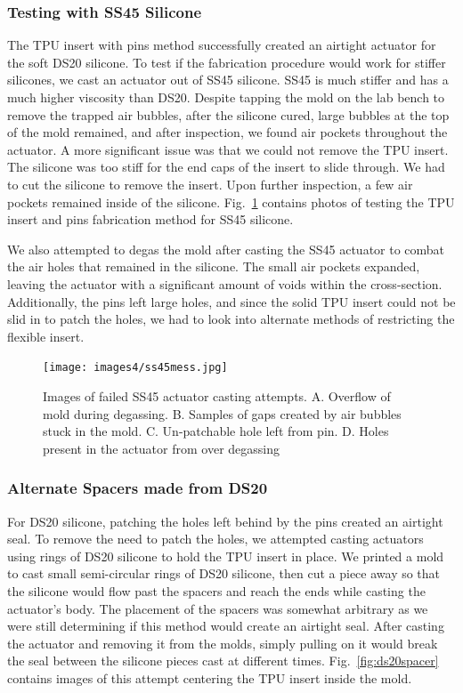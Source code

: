 \subsubsection{Testing with SS45 Silicone}

The TPU insert with pins method successfully created an airtight actuator for the soft DS20 silicone. To test if the fabrication procedure would work for stiffer silicones, we cast an actuator out of SS45 silicone. SS45 is much stiffer and has a much higher viscosity than DS20. Despite tapping the mold on the lab bench to remove the trapped air bubbles, after the silicone cured, large bubbles at the top of the mold remained, and after inspection, we found air pockets throughout the actuator. A more significant issue was that we could not remove the TPU insert. The silicone was too stiff for the end caps of the insert to slide through. We had to cut the silicone to remove the insert. Upon further inspection, a few air pockets remained inside of the silicone. Fig.~\ref{fig:ss45mess} contains photos of testing the TPU insert and pins fabrication method for SS45 silicone. 

We also attempted to degas the mold after casting the SS45 actuator to combat the air holes that remained in the silicone. The small air pockets expanded, leaving the actuator with a significant amount of voids within the cross-section. Additionally, the pins left large holes, and since the solid TPU insert could not be slid in to patch the holes, we had to look into alternate methods of restricting the flexible insert. 

\begin{figure}[!ht]
    \centering
    \texttt{[image: images4/ss45mess.jpg]}
    \caption{Images of failed SS45 actuator casting attempts. A. Overflow of mold during degassing. B. Samples of gaps created by air bubbles stuck in the mold. C. Un-patchable hole left from pin. D. Holes present in the actuator from over degassing}
    \label{fig:ss45mess}
\end{figure}

\subsubsection{Alternate Spacers made from DS20}

For DS20 silicone, patching the holes left behind by the pins created an airtight seal. To remove the need to patch the holes, we attempted casting actuators using rings of DS20 silicone to hold the TPU insert in place. We printed a mold to cast small semi-circular rings of DS20 silicone, then cut a piece away so that the silicone would flow past the spacers and reach the ends while casting the actuator's body. The placement of the spacers was somewhat arbitrary as we were still determining if this method would create an airtight seal. After casting the actuator and removing it from the molds, simply pulling on it would break the seal between the silicone pieces cast at different times. Fig.~\ref{fig:ds20spacer} contains images of this attempt centering the TPU insert inside the mold. 

